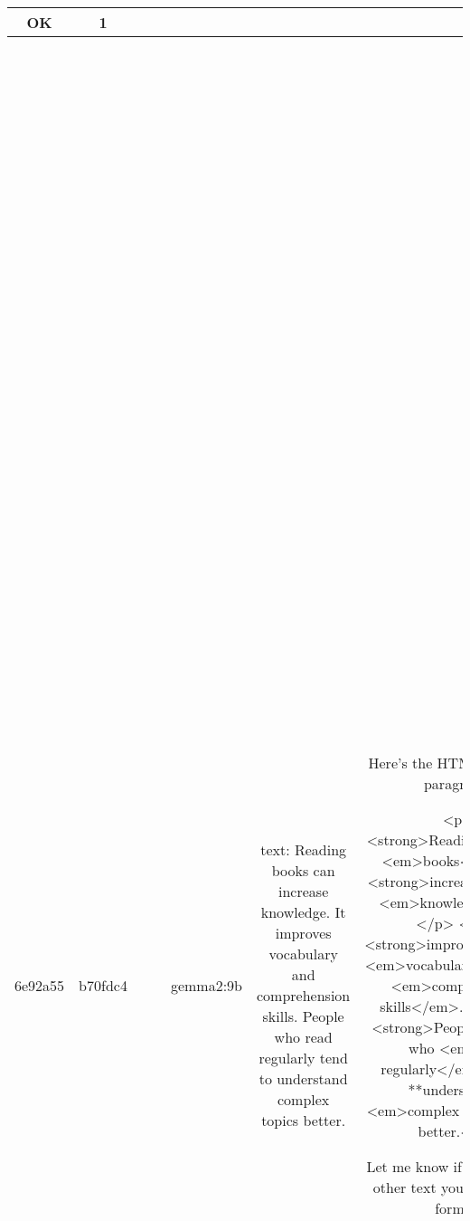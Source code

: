 \begin{table}[h!]
\begin{tabular}{|c|c|c|c|c|c|c|c|c|c|}
OK & 1\\
\hline
6e92a55 & b70fdc4 &  &  & gemma2:9b & text: Reading books can increase knowledge. It improves vocabulary and comprehension skills. People who read regularly tend to understand complex topics better. & Here's the HTML formatted paragraph:

<p><strong>Reading</strong> <em>books</em> can <strong>increase</strong> <em>knowledge</em>.</p>
<p>It <strong>improves</strong> <em>vocabulary</em> and <em>comprehension skills</em>.</p>
<p><strong>People</strong> who <em>read regularly</em> tend to **understand** <em>complex topics</em> better.</p>


Let me know if you have any other text you'd like me to format! & err & The chatbot output consists of three sentences, each wrapped in its own `<p>` tag, which complies with the requirement of having at least three `<p>` tags. 

1. The first `<p>` tag contains a `<strong>` tag emphasizing the word "Reading" and two `<em>` tags emphasizing "books" and "knowledge", which follows the instruction to use one `<strong>` tag and multiple `<em>` tags within each sentence.

2. The second `<p>` tag has a `<strong>` tag emphasizing "improves" and `<em>` tags for "vocabulary" and "comprehension skills."

3. The third `<p>` tag has a `<strong>` tag around "People," and although it intends to emphasize text with asterisks around "understand," it should have used a `<strong>` tag as required. It also contains `<em>` tags for "read regularly" and "complex topics."

The third sentence improperly uses asterisks for emphasis instead of an HTML `<strong>` tag, which breaches the requirement to use a `<strong>` tag. This discrepancy leads to non-compliance with the description provided.

ERR & 1\\
\hline
6e92a55 & b70fdc4 &  &  & qwen2.5:3b & text: Reading books can increase knowledge. It improves vocabulary and comprehension skills. People who read regularly tend to understand complex topics better. & Here is the paragraph formatted with HTML tags:

```html
<p><strong>Reading</strong> books can <em>increase</em> knowledge. It <em>improves</em> vocabulary and <em>comprehension</em> skills. People who read regularly tend to understand <em>complex</em> topics better.</p>
```

Please note that the second paragraph is identical to the first, so I'll only format one as per your instruction. If you need both formatted, please let me know! & err & The chatbot output does not comply with the description for the following reasons:


\end{tabular}
\end{table}
